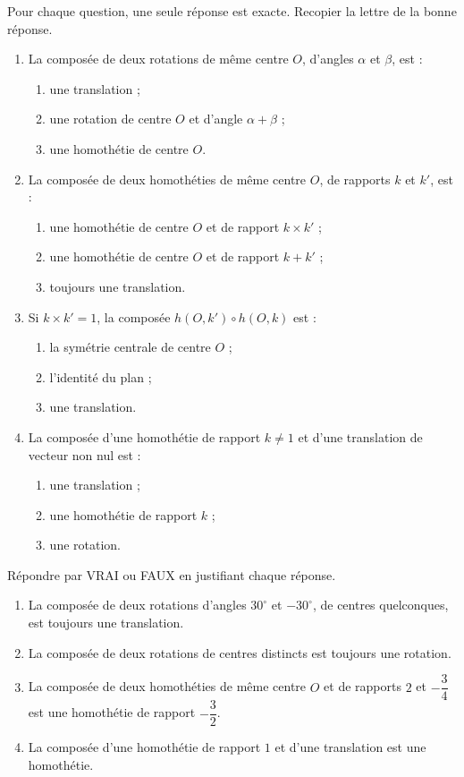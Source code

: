 \documentclass[11pt]{article}
\begin{document}
\begin{exercice}
Pour chaque question, une seule réponse est exacte. Recopier la lettre de la bonne réponse.
\begin{enumerate}
\item La composée de deux rotations de même centre $O$, d'angles $\alpha$ et $\beta$, est :
\begin{enumerate}
\item une translation ;
\item une rotation de centre $O$ et d'angle $\alpha+\beta$ ;
\item une homothétie de centre $O$.
\end{enumerate}
\item La composée de deux homothéties de même centre $O$, de rapports $k$ et $k'$, est :
\begin{enumerate}
\item une homothétie de centre $O$ et de rapport $k\times k'$ ;
\item une homothétie de centre $O$ et de rapport $k+k'$ ;
\item toujours une translation.
\end{enumerate}
\item Si $k\times k'=1$, la composée $h(O,k')\circ h(O,k)$ est :
\begin{enumerate}
\item la symétrie centrale de centre $O$ ;
\item l'identité du plan ;
\item une translation.
\end{enumerate}
\item La composée d'une homothétie de rapport $k\neq 1$ et d'une translation de vecteur non nul est :
\begin{enumerate}
\item une translation ;
\item une homothétie de rapport $k$ ;
\item une rotation.
\end{enumerate}
\end{enumerate}
\end{exercice}

\begin{exercice}
Répondre par VRAI ou FAUX en justifiant chaque réponse.
\begin{enumerate}
\item La composée de deux rotations d'angles $30^{\circ}$ et $-30^{\circ}$, de centres quelconques, est toujours une translation.
\item La composée de deux rotations de centres distincts est toujours une rotation.
\item La composée de deux homothéties de même centre $O$ et de rapports $2$ et $-\dfrac{3}{4}$ est une homothétie de rapport $-\dfrac{3}{2}$.
\item La composée d'une homothétie de rapport $1$ et d'une translation est une homothétie.
\end{enumerate}
\end{exercice}
\end{document}
